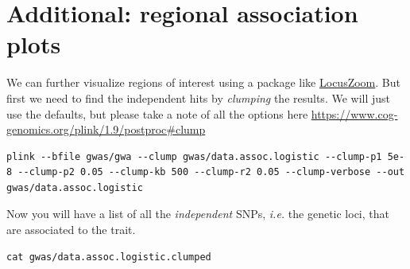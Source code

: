 \documentclass[
]{book}
\newenvironment{Shaded}{\begin{snugshade}}{\end{snugshade}}
\newcommand{\CommentTok}[1]{\textcolor[rgb]{0.56,0.35,0.01}{\textit{#1}}}
\newcommand{\FunctionTok}[1]{\textcolor[rgb]{0.00,0.00,0.00}{#1}}
\newcommand{\NormalTok}[1]{#1}
\newcommand{\OperatorTok}[1]{\textcolor[rgb]{0.81,0.36,0.00}{\textbf{#1}}}
\newcommand{\StringTok}[1]{\textcolor[rgb]{0.31,0.60,0.02}{#1}}
\newcommand{\VariableTok}[1]{\textcolor[rgb]{0.00,0.00,0.00}{#1}}
\begin{document}
\hypertarget{add_chapter_regional_plot}{%
\chapter{Additional: regional association plots}\label{add_chapter_regional_plot}}

We can further visualize regions of interest using a package like \href{http://locuszoom.org}{LocusZoom}. But first we need to find the independent hits by \emph{clumping} the results. We will just use the defaults, but please take a note of all the options here \url{https://www.cog-genomics.org/plink/1.9/postproc\#clump}

\begin{verbatim}
plink --bfile gwas/gwa --clump gwas/data.assoc.logistic --clump-p1 5e-8 --clump-p2 0.05 --clump-kb 500 --clump-r2 0.05 --clump-verbose --out gwas/data.assoc.logistic
\end{verbatim}

Now you will have a list of all the \emph{independent} SNPs, \emph{i.e.} the genetic loci, that are associated to the trait.

\begin{verbatim}
cat gwas/data.assoc.logistic.clumped
\end{verbatim}

\begin{Shaded}
\end{Shaded}
\end{document}
